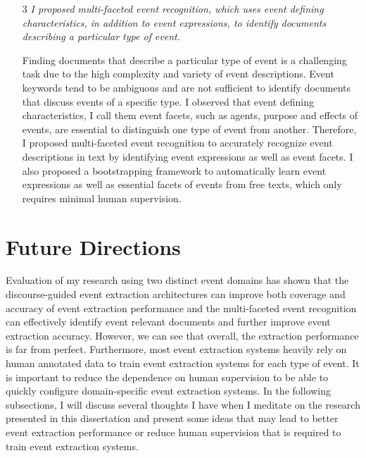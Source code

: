 \begin{enumerate}
   \item[3] {\em{
I proposed multi-faceted event recognition, which 
uses event defining characteristics, in addition to event expressions, to identify documents 
describing a particular type of event.}}

Finding documents that describe a particular type of event is a 
challenging task due to the high complexity and variety
of event descriptions. Event keywords tend to be ambiguous 
and are not sufficient to identify documents that discuss 
events of a specific type.
I observed that event defining characteristics, I call them event facets, 
such as agents, purpose and effects of events, 
are essential to distinguish one type of event from another.
Therefore, I proposed multi-faceted event recognition to 
accurately recognize event descriptions in
text by identifying event expressions as well as 
event facets. 
I also proposed a bootstrapping framework to 
automatically learn event expressions as
well as essential facets of events from free texts, which 
only requires 
minimal human supervision.
  \end{enumerate}

\section{Future Directions}

Evaluation of my research using two distinct event domains 
has shown that the 
discourse-guided event extraction architectures can  
improve both coverage and accuracy of event extraction performance 
and the multi-faceted event recognition can 
effectively identify event relevant documents and further 
improve event extraction accuracy. 
However, we can see that overall, 
the extraction performance is far from 
perfect. 
Furthermore, 
most event extraction systems heavily rely on 
human annotated data to train event extraction systems for each 
type of event. 
It is important to reduce the dependence on human supervision 
to be able to quickly configure domain-specific event extraction systems.
In the following subsections, I will discuss 
several thoughts I have when I meditate on the research presented  
in this dissertation and 
present some ideas that 
may lead to better event extraction performance 
or reduce human supervision that is required to train event extraction systems.  

